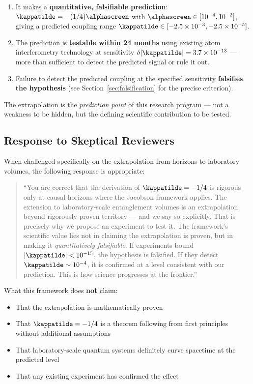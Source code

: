 \begin{enumerate}
    \item It makes a \textbf{quantitative, falsifiable prediction}:
    $\kappatilde = -(1/4)\alphascreen$ with $\alphascreen\in[10^{-4},10^{-2}]$,
    giving a predicted coupling range
    $\kappatilde \in [-2.5\times10^{-3}, -2.5\times10^{-5}]$.

    \item The prediction is \textbf{testable within 24 months} using
    existing atom interferometry technology at sensitivity
    $\delta|\kappatilde| = 3.7\times10^{-13}$ --- more than sufficient
    to detect the predicted signal or rule it out.

    \item Failure to detect the predicted coupling at the specified
    sensitivity \textbf{falsifies the hypothesis}
    (see Section~\ref{sec:falsification} for the precise criterion).
\end{enumerate}

The extrapolation is the \emph{prediction point} of this research program
--- not a weakness to be hidden, but the defining scientific contribution
to be tested.

\subsection{Response to Skeptical Reviewers}
\label{subsec:response_to_reviewers}

When challenged specifically on the extrapolation from horizons to
laboratory volumes, the following response is appropriate:

\begin{quote}
``You are correct that the derivation of $\kappatilde = -1/4$ is rigorous
only at causal horizons where the Jacobson framework applies. The extension
to laboratory-scale entanglement volumes is an extrapolation beyond
rigorously proven territory --- and we say so explicitly. That is precisely
why we propose an experiment to test it. The framework's scientific value
lies not in claiming the extrapolation is proven, but in making it
\emph{quantitatively falsifiable}. If experiments bound
$|\kappatilde| < 10^{-15}$, the hypothesis is falsified. If they detect
$\kappatilde \sim 10^{-4}$, it is confirmed at a level consistent with our
prediction. This is how science progresses at the frontier.''
\end{quote}

\noindent What this framework does \textbf{not} claim:
\begin{itemize}
    \item[$\times$] That the extrapolation is mathematically proven
    \item[$\times$] That $\kappatilde = -1/4$ is a theorem following from
    first principles without additional assumptions
    \item[$\times$] That laboratory-scale quantum systems definitely
    curve spacetime at the predicted level
    \item[$\times$] That any existing experiment has confirmed the effect
\end{itemize}

